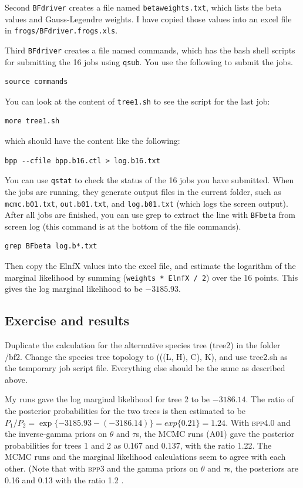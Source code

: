 \documentclass{book}
\numberwithin{equation}{section} \renewcommand{\baselinestretch}{0.55}
\begin{document}
Second \texttt{BFdriver} creates a file named
\texttt{betaweights.txt}, which lists the beta values and
Gauss-Legendre weights.  I have copied those values into an excel file
in \texttt{frogs/BFdriver.frogs.xls}.

Third \texttt{BFdriver} creates a file named commands, which has the
bash shell scripts for submitting the 16 jobs using \texttt{qsub}.
You use the following to submit the jobs.
\begin{verbatim}
source commands
\end{verbatim}

You can look at the content of \texttt{tree1.sh} to see the script for
the last job:
\begin{verbatim}
more tree1.sh
\end{verbatim}
which should have the content like the following:
\begin{verbatim}
bpp --cfile bpp.b16.ctl > log.b16.txt
\end{verbatim}

You can use \texttt{qstat} to check the status of the 16 jobs you have
submitted.  When the jobs are running, they generate output files in
the current folder, such as \texttt{mcmc.b01.txt},
\texttt{out.b01.txt}, and \texttt{log.b01.txt} (which logs the screen
output).  After all jobs are finished, you can use grep to extract the
line with \texttt{BFbeta} from screen log (this command is at the
bottom of the file commands).
\begin{verbatim}
grep BFbeta log.b*.txt
\end{verbatim}
Then copy the ElnfX values into the excel file, and estimate the
logarithm of the marginal likelihood by summing (\texttt{weights *
  ElnfX / 2}) over the 16 points. This gives the log marginal
likelihood to be $-3185.93$.

\subsection{Exercise and results}

Duplicate the calculation for the alternative species tree (tree2) in
the folder /bf2.  Change the species tree topology to (((L, H), C),
K), and use tree2.sh as the temporary job script file.  Everything
else should be the same as described above.

My runs gave the log marginal likelihood for tree 2 to be $-3186.14$.
The ratio of the posterior probabilities for the two trees is then
estimated to be
$P_1/P_2 = \exp\{-3185.93 - (-3186.14)\} = exp\{0.21\} = 1.24$.  With
\textsc{bpp}4.0 and the inverse-gamma priors on $\theta$ and $\tau$s,
the MCMC runs (A01) gave the posterior probabilities for trees 1 and 2
as 0.167 and 0.137, with the ratio 1.22.  The MCMC runs and the
marginal likelihood calculations seem to agree with each other.  (Note
that with \textsc{bpp3} and the gamma priors on $\theta$ and $\tau$s,
the posteriors are 0.16 and 0.13 with the ratio 1.2
\citep[][fig.~4]{Yang2015}.
\end{document}
